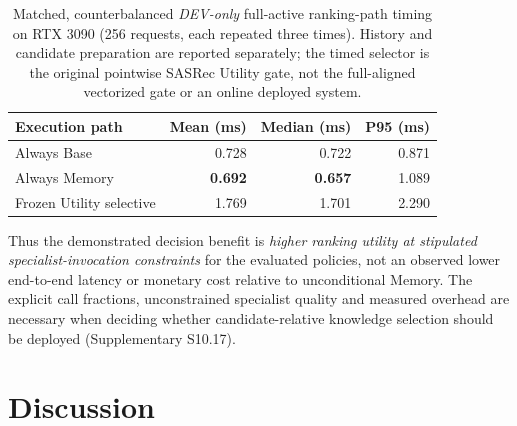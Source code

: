 \begin{table}[!htbp]
\centering
\caption{Matched, counterbalanced \emph{DEV-only} full-active ranking-path timing on RTX 3090 (256 requests, each repeated three times). History and candidate preparation are reported separately; the timed selector is the original pointwise SASRec Utility gate, not the full-aligned vectorized gate or an online deployed system.}
\label{tab:results-n10-cost}
\footnotesize
\setlength{\tabcolsep}{8pt}
\begin{tabular}{@{}lrrr@{}}
\toprule
Execution path & Mean (ms) & Median (ms) & P95 (ms) \\
\midrule
Always Base & 0.728 & 0.722 & 0.871 \\
Always Memory & \textbf{0.692} & \textbf{0.657} & 1.089 \\
Frozen Utility selective & 1.769 & 1.701 & 2.290 \\
\bottomrule
\end{tabular}
\end{table}

Thus the demonstrated decision benefit is \emph{higher ranking utility at stipulated specialist-invocation constraints} for the evaluated policies, not an observed lower end-to-end latency or monetary cost relative to unconditional Memory. The explicit call fractions, unconstrained specialist quality and measured overhead are necessary when deciding whether candidate-relative knowledge selection should be deployed (Supplementary S10.17).
\section{Discussion}
